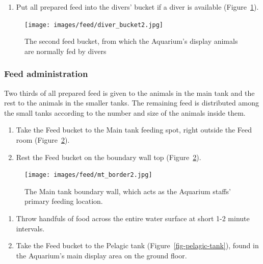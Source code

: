 \documentclass[
  12pt,
]{report}
\providecommand{\tightlist}{%
  \setlength{\itemsep}{0pt}\setlength{\parskip}{0pt}}\usepackage{longtable,booktabs,array}
\begin{document}
\begin{enumerate}
\def\labelenumi{\arabic{enumi}.}
\setcounter{enumi}{8}
\tightlist
\item
  Put all prepared feed into the divers' bucket if a diver is available
  (Figure~\ref{fig-diver-bucket}).
\end{enumerate}

\begin{figure}[H]

{\centering \texttt{[image: images/feed/diver\_bucket2.jpg]}

}

\caption{\label{fig-diver-bucket}The second feed bucket, from which the
Aquarium's display animals are normally fed by divers}

\end{figure}

\hypertarget{feed-administration}{%
\subsubsection{Feed administration}\label{feed-administration}}

Two thirds of all prepared feed is given to the animals in the main tank
and the rest to the animals in the smaller tanks. The remaining feed is
distributed among the small tanks according to the number and size of
the animals inside them.

\begin{enumerate}
\def\labelenumi{\arabic{enumi}.}
\setcounter{enumi}{9}
\tightlist
\item
  Take the Feed bucket to the Main tank feeding spot, right outside the
  Feed room (Figure~\ref{fig-mt-border}).
\item
  Rest the Feed bucket on the boundary wall top
  (Figure~\ref{fig-mt-border}).
\end{enumerate}

\begin{figure}[H]

{\centering \texttt{[image: images/feed/mt\_border2.jpg]}

}

\caption{\label{fig-mt-border}The Main tank boundary wall, which acts as
the Aquarium staffs' primary feeding location.}

\end{figure}

\begin{enumerate}
\def\labelenumi{\arabic{enumi}.}
\setcounter{enumi}{11}
\tightlist
\item
  Throw handfuls of food across the entire water surface at short 1-2
  minute intervals.
\item
  Take the Feed bucket to the Pelagic tank
  (Figure~\ref{fig-pelagic-tank}), found in the Aquarium's main display
  area on the ground floor.
\end{enumerate}
\end{document}
